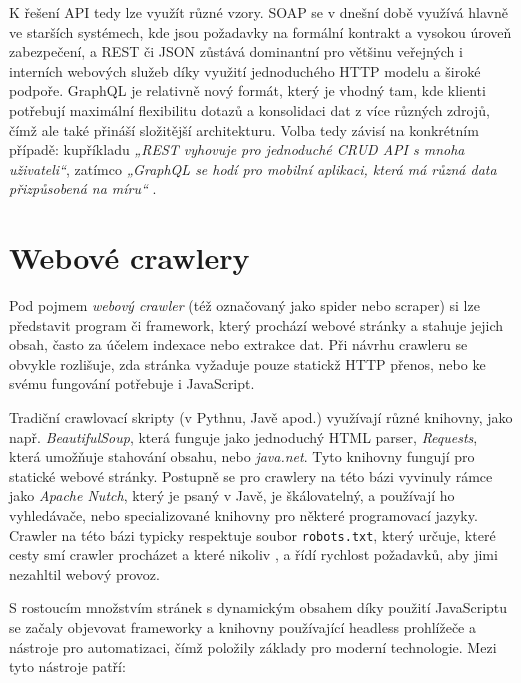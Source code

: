 \newpage

K řešení API tedy lze využít různé vzory. SOAP se v dnešní době využívá
hlavně ve starších systémech, kde jsou požadavky na formální kontrakt
a vysokou úroveň zabezpečení, a REST či JSON zůstává dominantní pro většinu
veřejných i interních webových služeb díky využití jednoduchého HTTP modelu
a široké podpoře. GraphQL je relativně nový formát, který je vhodný tam,
kde klienti potřebují maximální flexibilitu dotazů a konsolidaci dat
z více různých zdrojů, čímž ale také přináší složitější architekturu. Volba
tedy závisí na konkrétním případě: kupříkladu \emph{„REST vyhovuje
pro jednoduché CRUD API s mnoha uživateli“}, zatímco \emph{„GraphQL se hodí
pro mobilní aplikaci, která má různá data přizpůsobená na míru“}
\cite{YHVfLHsNlUItkF6G,Sj7FFY7SXnJ6m41T}. %

\section{Webové crawlery}
\label{sec:research-crawlers}

Pod pojmem \emph{webový crawler} (též označovaný jako spider nebo scraper)
si lze představit program či framework, který prochází webové stránky
a stahuje jejich obsah, často za účelem indexace nebo extrakce dat.
Při návrhu crawleru se obvykle rozlišuje, zda stránka vyžaduje pouze
statickž HTTP přenos, nebo ke svému fungování potřebuje i JavaScript.

Tradiční crawlovací skripty (v Pythnu, Javě apod.) využívají různé knihovny,
jako např. \emph{BeautifulSoup}, která funguje jako jednoduchý HTML parser,
\emph{Requests}, která umožňuje stahování obsahu, nebo \emph{java.net}. Tyto
knihovny fungují pro statické webové stránky. Postupně se pro crawlery
na této bázi vyvinuly rámce jako \emph{Apache Nutch}, který je psaný v Javě,
je škálovatelný, a používají ho vyhledávače, nebo specializované knihovny
pro některé programovací jazyky. Crawler na této bázi typicky respektuje
soubor \texttt{robots.txt}, který určuje, které cesty smí crawler procházet
a které nikoliv \cite{YHVfLHsNlUItkF6G,adi8S69Mmo0Mi7FC}, %
a řídí rychlost požadavků, aby jimi nezahltil webový provoz.

S rostoucím množstvím stránek s dynamickým obsahem díky použití JavaScriptu
se začaly objevovat frameworky a knihovny používající headless prohlížeče
a nástroje pro automatizaci, čímž položily základy pro moderní technologie.
Mezi tyto nástroje patří:

